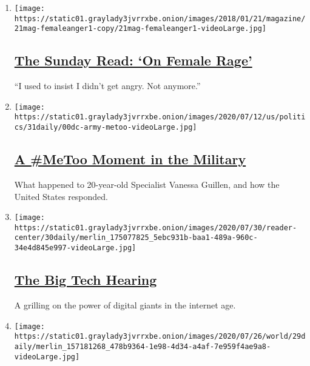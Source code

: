 \begin{enumerate}
\def\labelenumi{\arabic{enumi}.}
\item
  \texttt{[image: https://static01.graylady3jvrrxbe.onion/images/2018/01/21/magazine/21mag-femaleanger1-copy/21mag-femaleanger1-videoLarge.jpg]}

  \hypertarget{the-sunday-read-on-female-rage}{%
  \subsection{\texorpdfstring{\href{/2020/08/02/podcasts/the-daily/on-female-rage.html}{The
  Sunday Read: `On Female
  Rage'}}{The Sunday Read: `On Female Rage'}}\label{the-sunday-read-on-female-rage}}

  ``I used to insist I didn't get angry. Not anymore.''
\item
  \texttt{[image: https://static01.graylady3jvrrxbe.onion/images/2020/07/12/us/politics/31daily/00dc-army-metoo-videoLarge.jpg]}

  \hypertarget{a-metoo-moment-in-the-military}{%
  \subsection{\texorpdfstring{\href{/2020/07/31/podcasts/the-daily/vanessa-guillen-military-metoo.html}{A
  \#MeToo Moment in the
  Military}}{A \#MeToo Moment in the Military}}\label{a-metoo-moment-in-the-military}}

  What happened to 20-year-old Specialist Vanessa Guillen, and how the
  United States responded.
\item
  \texttt{[image: https://static01.graylady3jvrrxbe.onion/images/2020/07/30/reader-center/30daily/merlin\_175077825\_5ebc931b-baa1-489a-960c-34e4d845e997-videoLarge.jpg]}

  \hypertarget{the-big-tech-hearing}{%
  \subsection{\texorpdfstring{\href{/2020/07/30/podcasts/the-daily/congress-facebook-amazon-google-apple.html}{The
  Big Tech Hearing}}{The Big Tech Hearing}}\label{the-big-tech-hearing}}

  A grilling on the power of digital giants in the internet age.
\item
  \texttt{[image: https://static01.graylady3jvrrxbe.onion/images/2020/07/26/world/29daily/merlin\_157181268\_478b9364-1e98-4d34-a4af-7e959f4ae9a8-videoLarge.jpg]}


\end{enumerate}
